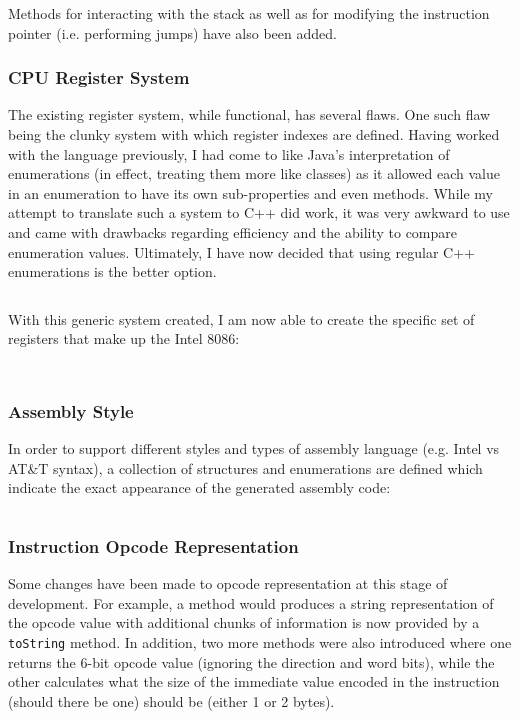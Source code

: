         Methods for interacting with the stack as well as for modifying the instruction pointer (i.e. performing jumps) have also been added.

    \subsubsection{CPU Register System}
        The existing register system, while functional, has several flaws. One such flaw being the clunky system with which register indexes are defined. Having worked with the language previously, I had come to like Java's interpretation of enumerations (in effect, treating them more like classes) as it allowed each value in an enumeration to have its own sub-properties and even methods. While my attempt to translate such a system to C++ did work, it was very awkward to use and came with drawbacks regarding efficiency and the ability to compare enumeration values. Ultimately, I have now decided that using regular C++ enumerations is the better option.

        \inputminted{c++}{code/third/registers.hpp}

        With this generic system created, I am now able to create the specific set of registers that make up the Intel 8086:

        \inputminted{c++}{code/third/registers8086.hpp}

        \inputminted{c++}{code/third/registers8086.cpp}

    \subsubsection{Assembly Style}
        In order to support different styles and types of assembly language (e.g. Intel vs AT\&T syntax), a collection of structures and enumerations are defined which indicate the exact appearance of the generated assembly code:

        \inputminted{c++}{code/third/assembly.hpp}

    \subsubsection{Instruction Opcode Representation}
        Some changes have been made to opcode representation at this stage of development. For example, a method would produces a string representation of the opcode value with additional chunks of information is now provided by a \texttt{toString} method. In addition, two more methods were also introduced where one returns the 6-bit opcode value (ignoring the direction and word bits), while the other calculates what the size of the immediate value encoded in the instruction (should there be one) should be (either 1 or 2 bytes).

